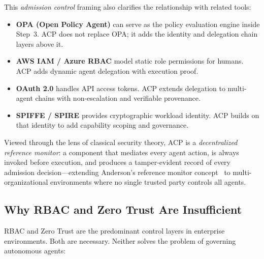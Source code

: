 \documentclass[11pt]{article}
\theoremstyle{definition}
\begin{document}
This \emph{admission control} framing also clarifies the relationship with related tools:
\begin{itemize}[noitemsep]
  \item \textbf{OPA (Open Policy Agent)} \cite{opa} can serve as the policy evaluation engine inside Step~3.
        ACP does not replace OPA; it adds the identity and delegation chain layers above it.
  \item \textbf{AWS IAM / Azure RBAC} model static role permissions for humans.
        ACP adds dynamic agent delegation with execution proof.
  \item \textbf{OAuth 2.0} \cite{rfc6749} handles API access tokens.
        ACP extends delegation to multi-agent chains with non-escalation and verifiable provenance.
  \item \textbf{SPIFFE / SPIRE} \cite{spiffe} provides cryptographic workload identity.
        ACP builds on that identity to add capability scoping and governance.
\end{itemize}

\noindent Viewed through the lens of classical security theory, ACP is a
\emph{decentralized reference monitor}: a component that mediates every agent
action, is always invoked before execution, and produces a tamper-evident record
of every admission decision---extending Anderson's reference monitor concept~\cite{anderson1972planning}
to multi-organizational environments where no single trusted party controls all agents.

\subsection{Why RBAC and Zero Trust Are Insufficient}

RBAC and Zero Trust are the predominant control layers in enterprise environments.
Both are necessary. Neither solves the problem of governing autonomous agents:
\end{document}

